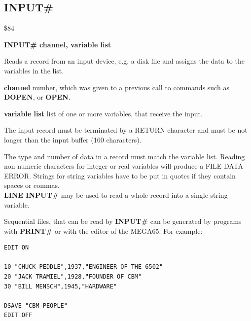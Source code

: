 
\newpage
\subsection{INPUT\#}
\begin{description}[leftmargin=2cm,style=nextline]
\item [Token:] \$84
\item [Format:] {\bf INPUT\# channel, variable list}
\item [Usage:] Reads a record
               from an input device, e.g. a disk file
               and assigns the data
               to the variables in the list.

               {\bf channel} number, which was given to a previous
               call to commands such as {\bf DOPEN}, or {\bf OPEN}.


               {\bf variable list} list of one or more
               variables, that receive the input.

               The input record must be terminated by a
               RETURN character and must be not longer than
               the input buffer (160 characters).

\item [Remarks:] The type and number of data in a record must
               match the variable list.
               Reading non numeric characters for integer or real
               variables will produce a FILE DATA ERROR.
               Strings for string variables have to be put in quotes
               if they contain spaces or commas. \\
               {\bf LINE INPUT\#} may be used to
               read a whole record into a single string variable.

               Sequential files, that can be read by {\bf INPUT\#}
               can be generated by programs with {\bf PRINT\#}
               or with the editor of the MEGA65.
               For example:

\begin{tcolorbox}[colback=black,coltext=white]
\verbatimfont{\codefont}
\begin{verbatim}
EDIT ON

10 "CHUCK PEDDLE",1937,"ENGINEER OF THE 6502"
20 "JACK TRAMIEL",1928,"FOUNDER OF CBM"
30 "BILL MENSCH",1945,"HARDWARE"

DSAVE "CBM-PEOPLE"
EDIT OFF
\end{verbatim}
\end{tcolorbox}


\end{description}
